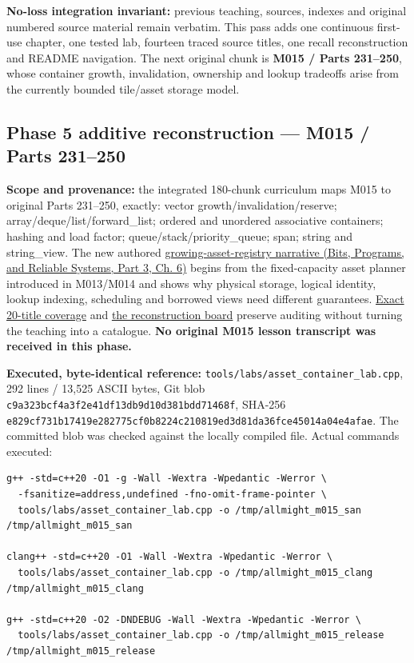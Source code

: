 \textbf{No-loss integration invariant:} previous teaching, sources, indexes and original numbered source material remain verbatim. This pass adds one continuous first-use chapter, one tested lab, fourteen traced source titles, one recall reconstruction and README navigation. The next original chunk is \textbf{M015 / Parts 231--250}, whose container growth, invalidation, ownership and lookup tradeoffs arise from the currently bounded tile/asset storage model.

\subsection{Phase 5 additive reconstruction --- M015 / Parts 231--250}\label{appendix-a103e7846d21-phase-5-additive-reconstruction-m015-parts-231250}

\hypertarget{appendix-a103e7846d21-phase-5-additive-reconstruction-m015-parts-231250}{}

\textbf{Scope and provenance:} the integrated 180-chunk curriculum maps M015 to original Parts 231--250, exactly: vector growth/invalidation/reserve; array/deque/list/forward\_list; ordered and unordered associative containers; hashing and load factor; queue/stack/priority\_queue; span; string and string\_view. The new authored \href{../01-Bits-Programs-and-Reliable-Systems-P03/main.pdf\#nameddest=01-foundations-i-ch006-an-asset-registry-grows-while-its-handles-must-not-change}{growing-asset-registry narrative (Bits, Programs, and Reliable Systems, Part 3, Ch. 6)} begins from the fixed-capacity asset planner introduced in M013/M014 and shows why physical storage, logical identity, lookup indexing, scheduling and borrowed views need different guarantees. \hyperref[appendix-fd090d982a15-m015-parts-231250-growing-the-asset-registry-without-losing-identities]{Exact 20-title coverage} and \hyperref[appendix-960160274237-a-growing-asset-store-must-preserve-its-promises-m015-retrieval]{the reconstruction board} preserve auditing without turning the teaching into a catalogue. \textbf{No original M015 lesson transcript was received in this phase.}

\textbf{Executed, byte-identical reference:} \texttt{tools/labs/asset\_container\_lab.cpp}, 292 lines / 13,525 ASCII bytes, Git blob \texttt{c9a323bcf4a3f2e41df13db9d10d381bdd71468f}, SHA-256 \texttt{e829cf731b17419e282775cf0b8224c210819ed3d81da36fce45014a04e4afae}. The committed blob was checked against the locally compiled file. Actual commands executed:

\begin{verbatim}
g++ -std=c++20 -O1 -g -Wall -Wextra -Wpedantic -Werror \
  -fsanitize=address,undefined -fno-omit-frame-pointer \
  tools/labs/asset_container_lab.cpp -o /tmp/allmight_m015_san
/tmp/allmight_m015_san

clang++ -std=c++20 -O1 -Wall -Wextra -Wpedantic -Werror \
  tools/labs/asset_container_lab.cpp -o /tmp/allmight_m015_clang
/tmp/allmight_m015_clang

g++ -std=c++20 -O2 -DNDEBUG -Wall -Wextra -Wpedantic -Werror \
  tools/labs/asset_container_lab.cpp -o /tmp/allmight_m015_release
/tmp/allmight_m015_release
\end{verbatim}

